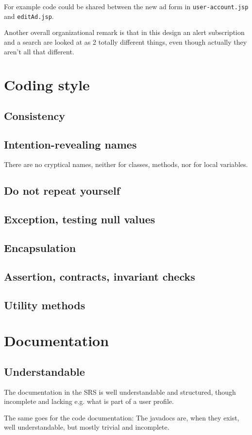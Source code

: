\documentclass[a4wide]{article}
\begin{document}
For example code could be shared between the new ad form in \texttt{user-account.jsp} and \texttt{editAd.jsp}. 

Another overall organizational remark is that in this design an alert subscription and a search are looked at as 2 totally different things, even though actually they aren't all that different. 

\section{Coding style}
\subsection{Consistency}
\subsection{Intention-revealing names}
There are no cryptical names, neither for classes, methods, nor for local variables.
\subsection{Do not repeat yourself}
\subsection{Exception, testing null values}
\subsection{Encapsulation}
\subsection{Assertion, contracts, invariant checks}
\subsection{Utility methods}
\section{Documentation}
\subsection{Understandable}
The documentation in the SRS is well understandable and structured, though incomplete and lacking e.g. what is part of a user profile.

The same goes for the code documentation: The javadocs are, when they exist, well understandable, but mostly trivial and incomplete.
\end{document}

